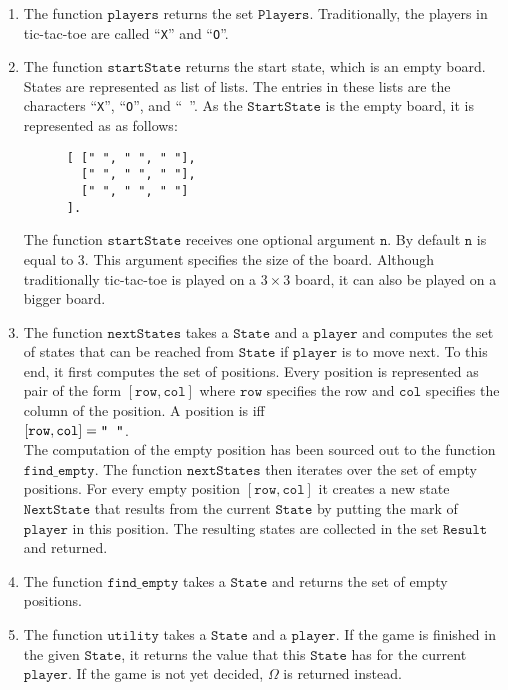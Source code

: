 \begin{enumerate}
\item The function $\mathtt{players}$ returns the set $\mathtt{Players}$.  Traditionally, the players in
      tic-tac-toe are called ``\texttt{X}'' and ``\texttt{O}''.
\item The function $\mathtt{startState}$ returns the start state, which is an empty board.
      States are represented as list of lists.  The entries in these lists are the characters 
      ``\texttt{X}'', ``\texttt{O}'', and ``\texttt{ }''.
      As the  $\mathtt{StartState}$ is the empty board, it is represented as as follows:
      \begin{Verbatim}
      [ [" ", " ", " "], 
        [" ", " ", " "], 
        [" ", " ", " "]
      ].     
      \end{Verbatim}
      The function $\mathtt{startState}$ receives one optional argument $\mathtt{n}$.
      By default $\mathtt{n}$ is equal to $3$.  This argument specifies the size of the board.
      Although traditionally tic-tac-toe is played on a $3 \times 3$ board, it can also 
      be played on a bigger board.
\item The function $\mathtt{nextStates}$ takes a $\mathtt{State}$ and a $\mathtt{player}$ and computes the set
      of states that can be reached from $\mathtt{State}$ if $\mathtt{player}$ is to move next.
      To this end, it first computes the set of  positions.  Every position is represented as pair of the
      form $[\mathtt{row}, \mathtt{col}]$ where $\mathtt{row}$ specifies the row and $\mathtt{col}$ specifies
      the column of the position.  A position is  iff
      \\[0.2cm]
      \hspace*{1.3cm}
      $[\mathtt{row}, \mathtt{col}] = \texttt{\symbol{34}\;\;\symbol{34}}$.
      \\[0.2cm]
      The computation of the empty position has been sourced out to the function $\mathtt{find\_empty}$.
      The function $\mathtt{nextStates}$ then iterates over the set of empty positions. For every 
      empty position $[\mathtt{row}, \mathtt{col}]$ it creates a new state $\mathtt{NextState}$ that results
      from the current $\mathtt{State}$ by putting the mark of $\mathtt{player}$ in this position.  
      The resulting states are collected in the set $\mathtt{Result}$ and returned.
\item The function $\mathtt{find\_empty}$ takes a $\mathtt{State}$ and returns the set of empty positions.
\item The function $\mathtt{utility}$ takes a $\mathtt{State}$ and a $\mathtt{player}$.  If the game is 
      finished in the given $\mathtt{State}$, it returns the value that this $\mathtt{State}$ has for the
      current $\mathtt{player}$.  If the game is not yet decided, $\Omega$ is returned instead.
 

\end{enumerate}
